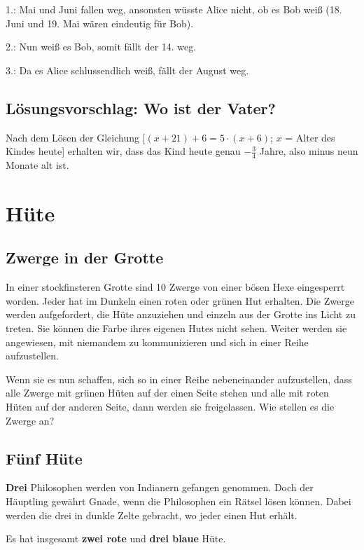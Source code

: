 {1.: Mai und Juni fallen weg, ansonsten wüsste Alice nicht, ob es Bob weiß (18.
Juni und 19. Mai wären eindeutig für Bob).

2.: Nun weiß es Bob, somit fällt der 14. weg.

3.: Da es Alice schlussendlich weiß, fällt der August weg.


\subsection{Lösungsvorschlag: Wo ist der Vater?}

Nach dem Lösen der Gleichung [$(x+21)+6 = 5·(x+6)$; $x$ = Alter des Kindes
heute] erhalten wir, dass das Kind heute genau $-\frac34$ Jahre, also minus neun
Monate alt ist.

}%
\newpage


\section{Hüte}
\subsection{Zwerge in der Grotte}
In einer stockfinsteren Grotte sind 10 Zwerge von einer bösen Hexe eingesperrt
worden. Jeder hat im Dunkeln einen roten oder grünen Hut erhalten. Die
Zwerge werden aufgefordert, die Hüte anzuziehen und einzeln aus der Grotte
ins Licht zu treten. Sie können die Farbe ihres eigenen Hutes nicht sehen.
Weiter werden sie angewiesen, mit niemandem zu kommunizieren und sich in
einer Reihe aufzustellen.

Wenn sie es nun schaffen, sich so in einer Reihe nebeneinander aufzustellen,
dass alle Zwerge mit grünen Hüten auf der einen Seite stehen und alle mit roten
Hüten auf der anderen Seite, dann werden sie freigelassen.
Wie stellen es die Zwerge an?


\subsection{Fünf Hüte}
\textbf{Drei} Philosophen werden von Indianern gefangen genommen. Doch der
Häuptling gewährt Gnade, wenn die Philosophen ein Rätsel lösen können. Dabei
werden die drei in dunkle Zelte gebracht, wo jeder einen Hut erhält.

Es hat insgesamt \textbf{zwei rote} und \textbf{drei blaue} Hüte.

